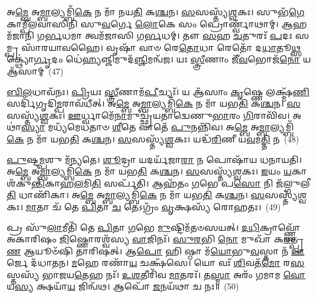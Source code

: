 {\anuvakamend[{𑌸𑍂𑌰𑍍𑌯᳴ 𑌏\-\ul{𑌕𑌾}\-𑌕𑍀 𑌚᳴𑌰\-\ul{𑌤𑌿} 𑌷𑌟𑍍𑌚᳴𑌤𑍍𑌵𑌾𑌰𑌿𑍞𑌶𑌚𑍍𑌚}]}%

𑌅\-\ul{𑌮𑍍𑌬𑍇} 𑌅\-\ul{𑌮𑍍𑌬𑌾}\-𑌲𑍍𑌯𑌮𑍍𑌬𑌿᳴\-\ul{𑌕𑍇} 𑌨 𑌮𑌾᳴ 𑌨𑌯\-\ul{𑌤𑌿} 𑌕\-\ul{𑌶𑍍𑌚}\-𑌨। \ul{𑌸}\-𑌸𑌸𑍍𑌤𑍍𑌯᳴\-\ul{𑌶𑍍𑌵}\-𑌕𑌃। 𑌸𑍁𑌭᳴\-\ul{𑌗𑍇} 𑌕𑌾𑌮𑍍𑌪𑍀᳴𑌲𑌵𑌾𑌸𑌿𑌨𑌿 𑌸𑍁\-\ul{𑌵}\-𑌰𑍍𑌗𑍇 \ul{𑌲𑍋}\-𑌕𑍇 𑌸𑌂 𑌪𑍍𑌰𑍋𑌰𑍍𑌣𑍍𑌵𑌾᳴𑌥𑌾𑌮𑍍। 𑌆𑌹𑌮᳴𑌜𑌾𑌨𑌿 𑌗\-\ul{𑌰𑍍𑌭}\-𑌧𑌮𑌾 𑌤𑍍𑌵𑌮᳴𑌜𑌾𑌸𑌿 𑌗\-\ul{𑌰𑍍𑌭}\-𑌧𑌮𑍍। 𑌤𑍗 \ul{𑌸}\-𑌹 \ul{𑌚}\-𑌤𑍁𑌰𑌃᳴ \ul{𑌪}\-𑌦𑌃 𑌸𑌮𑍍𑌪𑍍𑌰 𑌸𑌾᳴𑌰𑌯𑌾𑌵𑌹𑍈। 𑌵𑍃𑌷𑌾᳴ 𑌵𑌾𑍞 𑌰𑍇\-\ul{𑌤𑍋}\-𑌧𑌾 𑌰𑍇𑌤𑍋᳴ 𑌦\-\ul{𑌧𑌾}\-𑌤𑍂\-\ul{𑌥𑍍𑌸}\-𑌕𑍍𑌥𑍍𑌯𑍋॑\-\ul{𑌰𑍍𑌗𑍃}\-𑌦𑌂 𑌧𑍇॑\-\ul{𑌹𑍍𑌯}\-𑌞𑍍𑌜𑌿𑌮𑍁𑌦᳴\-\ul{𑌞𑍍𑌜𑌿}\-𑌮𑌨𑍍𑌵᳴𑌜। 𑌯𑌃 \ul{𑌸𑍍𑌤𑍍𑌰𑍀}\-𑌣𑌾𑌂 𑌜𑍀᳴\-\ul{𑌵}\-𑌭𑍋𑌜᳴\-\ul{𑌨𑍋} 𑌯 𑌆᳴𑌸𑌾𑌮𑍍~(47)

\-\ul{𑌬𑌿}\-\-\ul{𑌲}\-𑌧𑌾𑌵᳴𑌨𑌃। \ul{𑌪𑍍𑌰𑌿}\-𑌯𑌃 \ul{𑌸𑍍𑌤𑍍𑌰𑍀}\-𑌣𑌾𑌮᳴\-\ul{𑌪𑍀}\-𑌚𑍍𑌯𑌃᳴। 𑌯 𑌆᳴𑌸𑌾𑌂 \ul{𑌕𑍃}\-𑌷𑍍𑌣𑍇 𑌲𑌕𑍍𑌷𑍍𑌮᳴\-\ul{𑌣𑌿} 𑌸𑌰𑍍𑌦𑌿᳴𑌗𑍃𑌦𑌿\-\ul{𑌮𑍍𑌪}\-𑌰𑌾𑌵᳴𑌧𑍀𑌤𑍍। 𑌅\-\ul{𑌮𑍍𑌬𑍇} 𑌅\-\ul{𑌮𑍍𑌬𑌾}\-𑌲𑍍𑌯𑌮𑍍𑌬𑌿᳴\-\ul{𑌕𑍇} 𑌨 𑌮𑌾᳴ 𑌯𑌭\-\ul{𑌤𑌿} 𑌕\-\ul{𑌶𑍍𑌚}\-𑌨। \ul{𑌸}\-𑌸𑌸𑍍𑌤𑍍𑌯᳴\-\ul{𑌶𑍍𑌵}\-𑌕𑌃। \ul{𑌊}\-𑌰𑍍𑌧𑍍𑌵𑌾𑌮𑍇᳴\-\ul{𑌨𑌾}\-𑌮𑍁𑌚𑍍𑌛𑍍𑌰᳴𑌯𑌤𑌾𑌦𑍍𑌵𑍇𑌣𑍁\-\ul{𑌭𑌾}\-𑌰𑌂 \ul{𑌗𑌿}\-𑌰𑌾𑌵𑌿᳴𑌵। 𑌅𑌥𑌾॑\-\ul{𑌸𑍍𑌯𑌾} 𑌮𑌧𑍍𑌯᳴𑌮𑍇𑌧𑌤𑌾𑍞 \ul{𑌶𑍀}\-𑌤𑍇 𑌵𑌾𑌤𑍇᳴ \ul{𑌪𑍁}\-𑌨𑌨𑍍𑌨𑌿᳴𑌵। 𑌅\-\ul{𑌮𑍍𑌬𑍇} 𑌅\-\ul{𑌮𑍍𑌬𑌾}\-𑌲𑍍𑌯𑌮𑍍𑌬𑌿᳴\-\ul{𑌕𑍇} 𑌨 𑌮𑌾᳴ 𑌯𑌭\-\ul{𑌤𑌿} 𑌕\-\ul{𑌶𑍍𑌚}\-𑌨। \ul{𑌸}\-𑌸𑌸𑍍𑌤𑍍𑌯᳴\-\ul{𑌶𑍍𑌵}\-𑌕𑌃। 𑌯𑌦𑍍𑌧᳴\-\ul{𑌰𑌿}\-𑌣𑍀 𑌯\-\ul{𑌵}\-𑌮\-\ul{𑌤𑍍𑌤𑌿} 𑌨~(48)

\-\ul{𑌪𑍁}\-𑌷𑍍𑌟\-\ul{𑌮𑍍𑌪}\-𑌶𑍁 𑌮᳴𑌨𑍍𑌯𑌤𑍇। \ul{𑌶𑍂}\-𑌦𑍍𑌰𑌾 𑌯𑌦𑌰𑍍𑌯᳴𑌜𑌾\-\ul{𑌰𑌾} 𑌨 𑌪𑍋𑌷𑌾᳴𑌯 𑌧𑌨𑌾𑌯𑌤𑌿। 𑌅\-\ul{𑌮𑍍𑌬𑍇} 𑌅\-\ul{𑌮𑍍𑌬𑌾}\-𑌲𑍍𑌯𑌮𑍍𑌬𑌿᳴\-\ul{𑌕𑍇} 𑌨 𑌮𑌾᳴ 𑌯𑌭\-\ul{𑌤𑌿} 𑌕\-\ul{𑌶𑍍𑌚}\-𑌨। \ul{𑌸}\-𑌸𑌸𑍍𑌤𑍍𑌯᳴\-\ul{𑌶𑍍𑌵}\-𑌕𑌃। \ul{𑌇}\-𑌯𑌂 \ul{𑌯}\-𑌕𑌾 𑌶᳴𑌕𑍁\-\ul{𑌨𑍍𑌤𑌿}\-𑌕𑌾𑌹\-\ul{𑌲}\-𑌮𑌿\-\ul{𑌤𑌿} 𑌸𑌰𑍍𑌪᳴𑌤𑌿। 𑌆𑌹᳴𑌤𑌂 \ul{𑌗}\-𑌭𑍇 𑌪\-\ul{𑌸𑍋} 𑌨𑌿 𑌜᳴𑌲𑍍𑌗𑍁𑌲𑍀\-\ul{𑌤𑌿} 𑌧𑌾𑌣𑌿᳴𑌕𑌾। 𑌅\-\ul{𑌮𑍍𑌬𑍇} 𑌅\-\ul{𑌮𑍍𑌬𑌾}\-𑌲𑍍𑌯𑌮𑍍𑌬𑌿᳴\-\ul{𑌕𑍇} 𑌨 𑌮𑌾᳴ 𑌯𑌭\-\ul{𑌤𑌿} 𑌕\-\ul{𑌶𑍍𑌚}\-𑌨। \ul{𑌸}\-𑌸𑌸𑍍𑌤𑍍𑌯᳴\-\ul{𑌶𑍍𑌵}\-𑌕𑌃। \ul{𑌮𑌾}\-𑌤𑌾 𑌚᳴ 𑌤𑍇 \ul{𑌪𑌿}\-𑌤𑌾 \ul{𑌚} 𑌤𑍇\-𑌽𑌗𑍍𑌰𑌂᳴ \ul{𑌵𑍃}\-𑌕𑍍𑌷𑌸𑍍𑌯᳴ 𑌰𑍋𑌹𑌤𑌃।~(49)

𑌪𑍍𑌰 𑌸𑍁᳴\-\ul{𑌲𑌾}\-𑌮𑍀𑌤𑌿᳴ 𑌤𑍇 \ul{𑌪𑌿}\-𑌤𑌾 \ul{𑌗}\-𑌭𑍇 \ul{𑌮𑍁}\-𑌷𑍍𑌟𑌿𑌮᳴𑌤𑍞𑌸𑌯𑌤𑍍। \ul{𑌦}\-\-\ul{𑌧𑌿}\-𑌕𑍍𑌰𑌾𑌵𑍍𑌣𑍍𑌣𑍋᳴ 𑌅𑌕𑌾𑌰𑌿𑌷𑌂 \ul{𑌜𑌿}\-𑌷𑍍𑌣𑍋𑌰𑌶𑍍𑌵᳴𑌸𑍍𑌯 \ul{𑌵𑌾}\-𑌜𑌿𑌨𑌃᳴। \ul{𑌸𑍁}\-\-\ul{𑌰}\-𑌭𑌿 \ul{𑌨𑍋} 𑌮𑍁𑌖𑌾᳴ 𑌕\-\ul{𑌰}\-𑌤𑍍𑌪𑍍𑌰 \ul{𑌣} 𑌆𑌯𑍂𑍞᳴𑌷𑌿 𑌤𑌾𑌰𑌿𑌷𑌤𑍍। 𑌆\-\ul{𑌪𑍋} 𑌹𑌿 𑌷𑍍𑌠𑌾 𑌮᳴\-\ul{𑌯𑍋}\-𑌭𑍁\-\ul{𑌵}\-𑌸𑍍𑌤𑌾 𑌨᳴ \ul{𑌊}\-𑌰𑍍𑌜𑍇 𑌦᳴𑌧𑌾𑌤𑌨। \ul{𑌮}\-𑌹𑍇 𑌰𑌣𑌾᳴\-\ul{𑌯} 𑌚𑌕𑍍𑌷᳴𑌸𑍇। 𑌯𑍋 𑌵𑌃᳴ \ul{𑌶𑌿}\-𑌵𑌤᳴\-\ul{𑌮𑍋} 𑌰\-\ul{𑌸}\-𑌸𑍍𑌤𑌸𑍍𑌯᳴ 𑌭𑌾𑌜𑌯\-\ul{𑌤𑍇}\-𑌹 𑌨𑌃᳴। \ul{𑌉}\-\-\ul{𑌶}\-𑌤𑍀𑌰𑌿᳴𑌵 \ul{𑌮𑌾}\-𑌤𑌰𑌃᳴। 𑌤\-\ul{𑌸𑍍𑌮𑌾} 𑌅𑌰𑌂᳴ 𑌗𑌮𑌾𑌮 \ul{𑌵𑍋} 𑌯\-\ul{𑌸𑍍𑌯} 𑌕𑍍𑌷𑌯𑌾᳴\-\ul{𑌯} 𑌜𑌿𑌨𑍍𑌵᳴𑌥। 𑌆𑌪𑍋᳴ \ul{𑌜}\-𑌨𑌯᳴𑌥𑌾 𑌚 𑌨𑌃॥~(50)

{\anuvakamend[{\-\ul{𑌆}\-\-\ul{𑌸𑌾}\-𑌮\-\ul{𑌤𑍍𑌤𑌿} 𑌨 𑌰𑍋᳴𑌹\-\ul{𑌤𑍋} 𑌜𑌿𑌨𑍍𑌵᳴𑌥 \ul{𑌚}\-𑌤𑍍𑌵𑌾𑌰𑌿᳴ 𑌚}]}%

